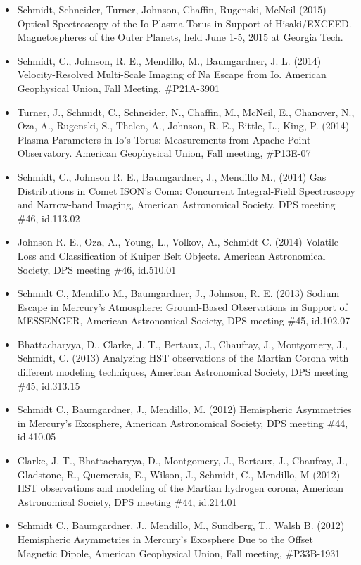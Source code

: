 \documentclass[12pt]{report}
\begin{document}
\begin{itemize}
   \item Schmidt, Schneider, Turner, Johnson, Chaffin, Rugenski, McNeil (2015) Optical Spectroscopy of the Io Plasma Torus in Support of Hisaki/EXCEED. Magnetospheres of the Outer Planets, held June 1-5, 2015 at Georgia Tech.
   \item Schmidt, C., Johnson, R. E., Mendillo, M., Baumgardner, J. L. (2014) Velocity-Resolved Multi-Scale Imaging of Na Escape from Io. American Geophysical Union, Fall Meeting, \#P21A-3901
   \item Turner, J., Schmidt, C., Schneider, N., Chaffin, M., McNeil, E., Chanover, N., Oza, A., Rugenski, S., Thelen, A., Johnson, R. E., Bittle, L., King, P. (2014) Plasma Parameters in Io's Torus: Measurements from Apache Point Observatory. American Geophysical Union, Fall meeting, \#P13E-07
   \item Schmidt, C., Johnson R. E., Baumgardner, J., Mendillo M., (2014) Gas Distributions in Comet ISON's Coma: Concurrent Integral-Field Spectroscopy and Narrow-band Imaging, American Astronomical Society, DPS meeting \#46, id.113.02
   \item Johnson R. E., Oza, A., Young, L., Volkov, A., Schmidt C. (2014) Volatile Loss and Classification of Kuiper Belt Objects. American Astronomical Society, DPS meeting \#46, id.510.01
   \item Schmidt C.,  Mendillo M., Baumgardner, J., Johnson, R. E. (2013) Sodium Escape in Mercury's Atmosphere: Ground-Based Observations in Support of MESSENGER, American Astronomical Society, DPS meeting \#45, id.102.07
   \item Bhattacharyya, D., Clarke, J. T., Bertaux, J., Chaufray, J., Montgomery, J., Schmidt, C. (2013) Analyzing HST observations of the Martian Corona with different modeling techniques, American Astronomical Society, DPS meeting \#45, id.313.15
   \item Schmidt C., Baumgardner, J., Mendillo, M. (2012) Hemispheric Asymmetries in Mercury's Exosphere, American Astronomical Society, DPS meeting \#44, id.410.05
   \item Clarke, J. T., Bhattacharyya, D., Montgomery, J., Bertaux, J., Chaufray, J., Gladstone, R., Quemerais, E., Wilson, J., Schmidt, C., Mendillo, M (2012) HST observations and modeling of the Martian hydrogen corona, American Astronomical Society, DPS meeting \#44, id.214.01
   \item Schmidt C., Baumgardner, J., Mendillo, M., Sundberg, T., Walsh B. (2012) Hemispheric Asymmetries in Mercury's Exosphere Due to the Offset Magnetic Dipole, American Geophysical Union, Fall meeting, \#P33B-1931

\end{itemize}
\end{document}
